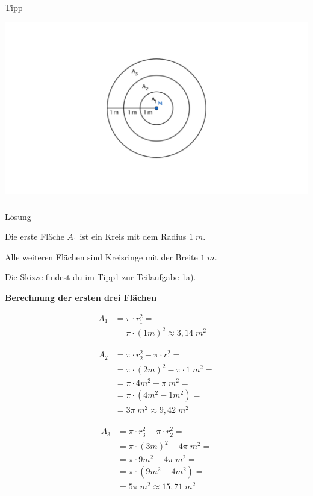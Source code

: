 \documentclass[
  ngerman,
]{book}
\begin{document}
Tipp

\includegraphics{./Bilder/hungrigeZiege.png}

\hypertarget{section-51}{%
\subsubsection*{}\label{section-51}}

Lösung

Die erste Fläche \(A_1\) ist ein Kreis mit dem Radius \(1\;m\).

Alle weiteren Flächen sind Kreisringe mit der Breite \(1\;m\).

Die Skizze findest du im Tipp1 zur Teilaufgabe 1a).

\textbf{Berechnung der ersten drei Flächen}

\[\begin{align} A_1 & = \pi \cdot r^2_1 = \\
                    &= \pi \cdot (1m)^2 \approx 3,14\;m^2 \quad \end{align}\]

\[\begin{align} A_2 &= \pi \cdot r^2_2 - \pi \cdot r^2_1 =\\
                    &= \pi \cdot (2m)^2 - \pi\cdot 1\;m^2 =\\
                    &= \pi \cdot 4m^2 - \pi\;m^2 =\\
                    &= \pi \cdot (4m^2- 1m^2)=\\
                    &= 3\pi\;m^2\approx 9,42\;m^2
\end{align}\]

\[\begin{align} A_3 &= \pi \cdot r^2_3 - \pi \cdot r^2_2 =\\
                    &= \pi \cdot (3m)^2 - 4\pi\;m^2 =\\
                    &= \pi \cdot 9m^2 - 4\pi\;m^2 =\\
                    &= \pi \cdot (9m^2-4m^2)=\\
                    &= 5\pi\;m^2\approx 15,71\;m^2
\end{align}\]
\end{document}
